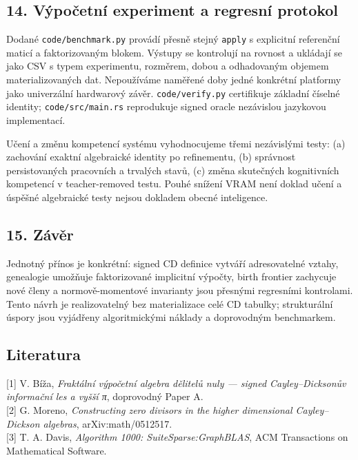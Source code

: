 \documentclass[
  10pt,
]{article}
\begin{document}
\subsection{14. Výpočetní experiment a regresní
protokol}\label{vuxfdpoux10detnuxed-experiment-a-regresnuxed-protokol}

Dodané \texttt{code/benchmark.py} provádí přesně stejný \texttt{apply} s
explicitní referenční maticí a faktorizovaným blokem. Výstupy se
kontrolují na rovnost a ukládají se jako CSV s typem experimentu,
rozměrem, dobou a odhadovaným objemem materializovaných dat. Nepoužíváme
naměřené doby jedné konkrétní platformy jako univerzální hardwarový
závěr. \texttt{code/verify.py} certifikuje základní číselné identity;
\texttt{code/src/main.rs} reprodukuje signed oracle nezávislou jazykovou
implementací.

Učení a změnu kompetencí systému vyhodnocujeme třemi nezávislými testy:
(a) zachování exaktní algebraické identity po refinementu, (b) správnost
persistovaných pracovních a trvalých stavů, (c) změna skutečných
kognitivních kompetencí v teacher-removed testu. Pouhé snížení VRAM není
doklad učení a úspěšné algebraické testy nejsou dokladem obecné
inteligence.

\subsection{15. Závěr}\label{zuxe1vux11br}

Jednotný přínos je konkrétní: signed CD definice vytváří adresovatelné
vztahy, genealogie umožňuje faktorizované implicitní výpočty, birth
frontier zachycuje nové členy a normově-momentové invarianty jsou
přesnými regresními kontrolami. Tento návrh je realizovatelný bez
materializace celé CD tabulky; strukturální úspory jsou vyjádřeny
algoritmickými náklady a doprovodným benchmarkem.

\subsection{Literatura}\label{literatura}

{[}1{]} V. Bíža, \emph{Fraktální výpočetní algebra dělitelů nuly ---
signed Cayley--Dicksonův informační les a vyšší π}, doprovodný Paper
A.\\
{[}2{]} G. Moreno, \emph{Constructing zero divisors in the higher
dimensional Cayley--Dickson algebras}, arXiv:math/0512517.\\
{[}3{]} T. A. Davis, \emph{Algorithm 1000: SuiteSparse:GraphBLAS}, ACM
Transactions on Mathematical Software.
\end{document}
